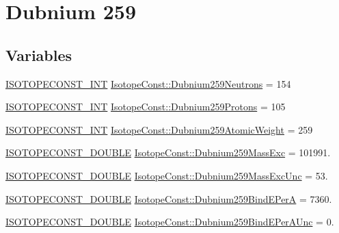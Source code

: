 \hypertarget{group___isotope_const-_dubnium-_db259}{}\section{Dubnium 259}
\label{group___isotope_const-_dubnium-_db259}
\subsection*{Variables}
\begin{DoxyCompactItemize}
\item 
\mbox{\hyperlink{group___isotope_const-_macros_ga5f18360b3e99483a35c32d789e62621c}{I\+S\+O\+T\+O\+P\+E\+C\+O\+N\+S\+T\+\_\+\+I\+NT}} \mbox{\hyperlink{group___isotope_const-_dubnium-_db259_ga076085c5b67b3a34cdb0cd0f8efb7c45}{Isotope\+Const\+::\+Dubnium259\+Neutrons}} = 154
\item 
\mbox{\hyperlink{group___isotope_const-_macros_ga5f18360b3e99483a35c32d789e62621c}{I\+S\+O\+T\+O\+P\+E\+C\+O\+N\+S\+T\+\_\+\+I\+NT}} \mbox{\hyperlink{group___isotope_const-_dubnium-_db259_gaf6ebb88b5bdf7c44fc3b3aae1cd81d66}{Isotope\+Const\+::\+Dubnium259\+Protons}} = 105
\item 
\mbox{\hyperlink{group___isotope_const-_macros_ga5f18360b3e99483a35c32d789e62621c}{I\+S\+O\+T\+O\+P\+E\+C\+O\+N\+S\+T\+\_\+\+I\+NT}} \mbox{\hyperlink{group___isotope_const-_dubnium-_db259_gafd8bc824c56216ae9117f926cc3b2bfc}{Isotope\+Const\+::\+Dubnium259\+Atomic\+Weight}} = 259
\item 
\mbox{\hyperlink{group___isotope_const-_macros_ga8f45a7272ce02c0b4c65c44636ed719a}{I\+S\+O\+T\+O\+P\+E\+C\+O\+N\+S\+T\+\_\+\+D\+O\+U\+B\+LE}} \mbox{\hyperlink{group___isotope_const-_dubnium-_db259_gadbc014b1ceaafdfa05f964b5816dd3ae}{Isotope\+Const\+::\+Dubnium259\+Mass\+Exc}} = 101991.
\item 
\mbox{\hyperlink{group___isotope_const-_macros_ga8f45a7272ce02c0b4c65c44636ed719a}{I\+S\+O\+T\+O\+P\+E\+C\+O\+N\+S\+T\+\_\+\+D\+O\+U\+B\+LE}} \mbox{\hyperlink{group___isotope_const-_dubnium-_db259_gae015b2a7fb97454a8b221440447be203}{Isotope\+Const\+::\+Dubnium259\+Mass\+Exc\+Unc}} = 53.
\item 
\mbox{\hyperlink{group___isotope_const-_macros_ga8f45a7272ce02c0b4c65c44636ed719a}{I\+S\+O\+T\+O\+P\+E\+C\+O\+N\+S\+T\+\_\+\+D\+O\+U\+B\+LE}} \mbox{\hyperlink{group___isotope_const-_dubnium-_db259_ga71549880712820052b1438bdf624db77}{Isotope\+Const\+::\+Dubnium259\+Bind\+E\+PerA}} = 7360.
\item 
\mbox{\hyperlink{group___isotope_const-_macros_ga8f45a7272ce02c0b4c65c44636ed719a}{I\+S\+O\+T\+O\+P\+E\+C\+O\+N\+S\+T\+\_\+\+D\+O\+U\+B\+LE}} \mbox{\hyperlink{group___isotope_const-_dubnium-_db259_ga26e492ce01843af46d818846c817c315}{Isotope\+Const\+::\+Dubnium259\+Bind\+E\+Per\+A\+Unc}} = 0.

\end{DoxyCompactItemize}
